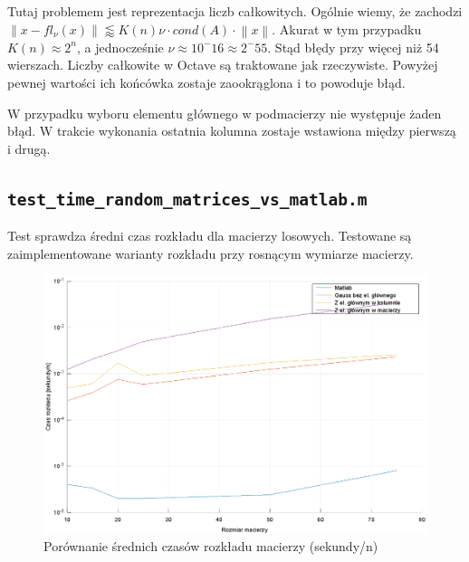 \documentclass{article}
\newcommand\norm[1]{\left\lVert#1\right\rVert}
\begin{document}
Tutaj problemem jest reprezentacja liczb całkowitych. Ogólnie wiemy, że zachodzi $ \norm{x - fl_\nu(x)} \lessapprox K(n)\nu \cdot cond(A) \cdot \norm{x} $. Akurat w tym przypadku $ K(n) \approx 2^n $, a jednocześnie $ \nu \approx 10^-16 \approx 2^-55 $. Stąd błędy przy więcej niż 54 wierszach. Liczby całkowite w Octave są traktowane jak rzeczywiste. Powyżej pewnej wartości ich końcówka zostaje zaookrąglona i to powoduje błąd.

W przypadku wyboru elementu głównego w podmacierzy nie występuje żaden błąd. W trakcie wykonania ostatnia kolumna zostaje wstawiona między pierwszą i drugą.

\subsection{\texttt{test\_time\_random\_matrices\_vs\_matlab.m}}
Test sprawdza średni czas rozkładu dla macierzy losowych. Testowane są zaimplementowane warianty rozkładu przy rosnącym wymiarze macierzy.

\begin{figure}[H]
    \centering
    \includegraphics[scale=1]{test_time_random_matrices_vs_matlab}
    \caption{Porównanie średnich czasów rozkładu macierzy (sekundy/n)}
\end{figure}
\end{document}
